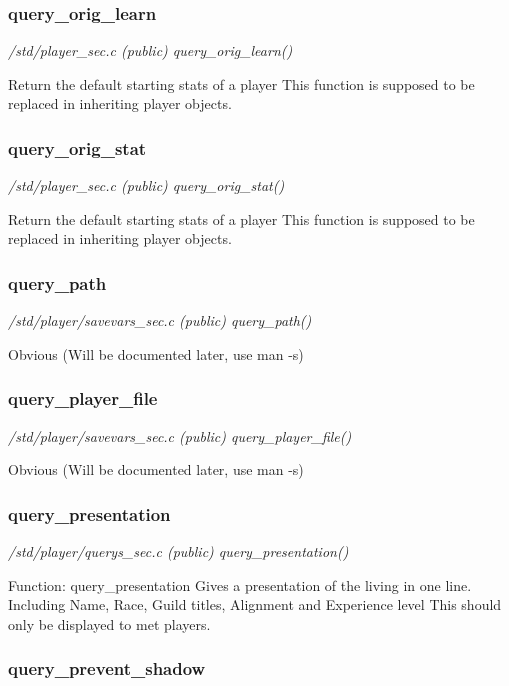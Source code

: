 \subsubsection{query\_orig\_learn}

{\em /std/player\_sec.c (public) query\_orig\_learn()}

Return the default starting stats of a player
This function is supposed to be replaced in inheriting
player objects.


\subsubsection{query\_orig\_stat}

{\em /std/player\_sec.c (public) query\_orig\_stat()}

Return the default starting stats of a player
This function is supposed to be replaced in inheriting
player objects.


\subsubsection{query\_path}

{\em /std/player/savevars\_sec.c (public) query\_path()}

Obvious (Will be documented later, use man -s)


\subsubsection{query\_player\_file}

{\em /std/player/savevars\_sec.c (public) query\_player\_file()}

Obvious (Will be documented later, use man -s)


\subsubsection{query\_presentation}

{\em /std/player/querys\_sec.c (public) query\_presentation()}

Function:    query\_presentation
Gives a presentation of the living in one line. Including
Name, Race, Guild titles, Alignment and Experience level
This should only be displayed to met players.


\subsubsection{query\_prevent\_shadow}

